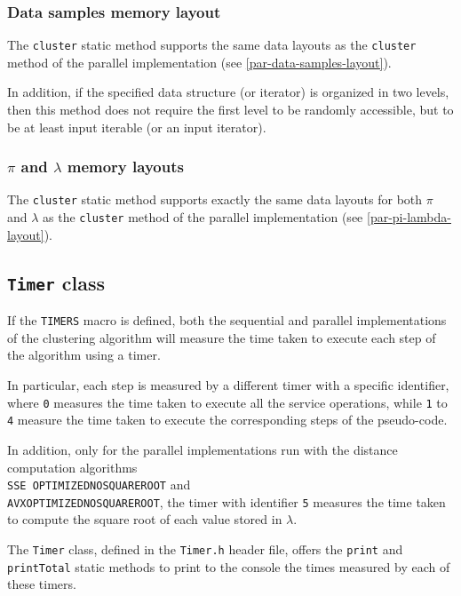 \documentclass{article}
\begin{document}
\hypertarget{seq-data-samples-layout}{
\subsubsection{Data samples memory layout}
\label{seq-data-samples-layout}}

The \texttt{cluster} static method supports the same data layouts as the \texttt{cluster} method
of the parallel implementation (see \ref{par-data-samples-layout}).

In addition, if the specified data structure (or iterator) is organized in two levels, then this
method does not require the first level to be randomly accessible, but to be at least input iterable (or an input iterator).

\hypertarget{seq-pi-lambda-layout}{
\subsubsection{\texorpdfstring{\boldmath$\pi$ and \boldmath$\lambda$}{pi and lambda} memory layouts}
\label{seq-pi-lambda-layout}}

The \texttt{cluster} static method supports exactly the same data layouts for both $\pi$
and $\lambda$ as the \texttt{cluster} method
of the parallel implementation (see \ref{par-pi-lambda-layout}).

\hypertarget{timers}{
\subsection{\texttt{Timer} class}
\label{timer}}

If the \texttt{TIMERS} macro is defined, both the sequential and parallel implementations of the
clustering algorithm will measure the time taken to execute each step of the algorithm using a
timer.

In particular, each step is measured by a different timer with a specific identifier, where
\texttt{0} measures the time taken to execute all the service operations, while \texttt{1} to
\texttt{4} measure the time taken to execute the corresponding steps of the pseudo-code.

In addition, only for the parallel implementations run with the distance
computation algorithms\\
\texttt{SSE\textunderscore
OPTIMIZED\textunderscore NO\textunderscore SQUARE\textunderscore ROOT} and\\
\texttt{AVX\textunderscore OPTIMIZED\textunderscore NO\textunderscore SQUARE\textunderscore ROOT},
the timer with identifier \texttt{5} measures the time taken to compute the square root of each value stored in $\lambda$.

The \texttt{Timer} class, defined in the \texttt{Timer.h} header file, offers the \texttt{print} and
\texttt{printTotal} static methods to print to the console the times measured by each of these timers.
\end{document}
